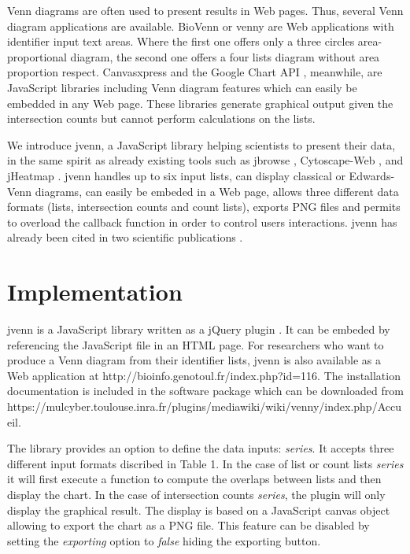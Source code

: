 \documentclass{bmcart}
\begin{document}
\cite{Bronwen2012}
\cite{RVennDiagram}

Venn diagrams are often used to present results in Web pages. Thus, several Venn diagram applications are 
available. BioVenn \cite{Hulsen2008} or venny \cite{venny} are Web applications with identifier input text 
areas. Where the first one offers only a three circles area-proportional diagram, the second one offers a 
four lists diagram without area proportion respect. Canvasxpress \cite{canvasxpress} and the Google Chart 
API \cite{googleAPI}, meanwhile, are JavaScript libraries including Venn diagram features which can easily 
be embedded in any Web page. These libraries generate graphical output given the intersection counts but 
cannot perform calculations on the lists.

We introduce jvenn, a JavaScript library helping scientists to present their data, in the same spirit as already 
existing tools such as jbrowse \cite{Westesson01032013}, Cytoscape-Web \cite{Lopes2010}, and jHeatmap \cite{DeuPons2014}. 
jvenn handles up to six input lists, can display classical or Edwards-Venn \cite{Edwards2004} diagrams, can easily be 
embeded in a Web page, allows three different data formats (lists, intersection counts and count lists), exports PNG files and permits 
to overload the callback function in order to control users interactions. jvenn has already been cited in two scientific 
publications \cite{Bianchia2013, Aravindraja2013}.


\section*{Implementation}

jvenn is a JavaScript library written as a jQuery plugin \cite{jquery}. It can be embeded by referencing the JavaScript file 
in an HTML page. For researchers who want to produce a Venn diagram from their identifier lists, jvenn is also available as a 
Web application at http://bioinfo.genotoul.fr/index.php?id=116. The installation documentation is included in the software package 
which can be downloaded from https://mulcyber.toulouse.inra.fr/plugins/mediawiki/wiki/venny/index.php/Accueil.

The library provides an option to define the data inputs: \textit{series}. It accepts three different input formats discribed in 
Table 1. In the case of list or count lists \textit{series} it will first execute a function to compute the overlaps between lists and then
display the chart. In the case of intersection counts \textit{series}, the plugin will only display the graphical result. The display 
is based on a JavaScript canvas object allowing to export the chart as a PNG file. This feature can be disabled by setting the \textit{exporting} 
option to \textit{false} hiding the exporting button.
\end{document}
